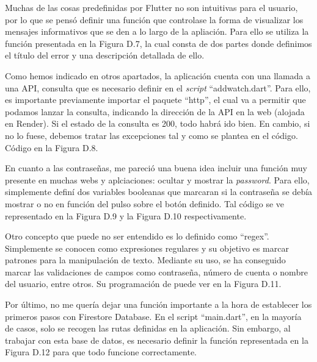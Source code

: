 
	Muchas de las cosas predefinidas por Flutter no son intuitivas para el usuario, por lo que se pensó definir una función que controlase la forma de visualizar los mensajes informativos que se den a lo largo de la apliación. Para ello se utiliza la función presentada en la Figura D.7, la cual consta de dos partes donde definimos el título del error y una descripción detallada de ello.
	

	Como hemos indicado en otros apartados, la aplicación cuenta con una llamada a una API, consulta que es necesario definir en el \emph{script} ``addwatch.dart''. Para ello, es importante previamente importar el paquete ``http'', el cual va a permitir que podamos lanzar la consulta, indicando la dirección de la API en la web (alojada en Render). Si el estado de la consulta es 200, todo habrá ido bien. En cambio, si no lo fuese, debemos tratar las excepciones tal y como se plantea en el código. Código en la Figura D.8.


	En cuanto a las contraseñas, me pareció una buena idea incluir una función muy presente en muchas webs y aplciaciones: ocultar y mostrar la \emph{password}. Para ello, simplemente definí dos variables booleanas que marcaran si la contraseña se debía mostrar o no en función del pulso sobre el botón definido. Tal código se ve representado en la Figura D.9 y la Figura D.10 respectivamente.


	Otro concepto que puede no ser entendido es lo definido como ``regex''. Simplemente se conocen como expresiones regulares y su objetivo es marcar patrones para la manipulación de texto. Mediante su uso, se ha conseguido marcar las validaciones de campos como contraseña, número de cuenta o nombre del usuario, entre otros. Su programación de puede ver en la Figura D.11.
	 

	Por último, no me quería dejar una función importante a la hora de establecer los primeros pasos con Firestore Database. En el script ``main.dart'', en la mayoría de casos, solo se recogen las rutas definidas en la aplicación. Sin embargo, al trabajar con esta base de datos, es necesario definir la función representada en la Figura D.12 para que todo funcione correctamente.
	
